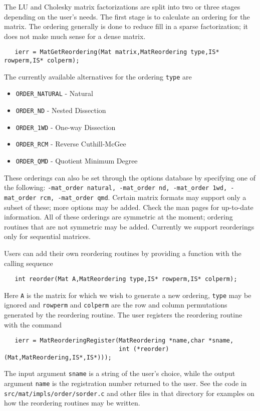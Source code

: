 The LU and Cholesky 
matrix factorizations are split into 
two or three stages depending on the user's needs. The first stage is 
to calculate an ordering for the matrix.  The ordering generally is 
done to reduce fill in a sparse factorization; it does not make much 
sense for a dense matrix.  
\begin{verbatim}
   ierr = MatGetReordering(Mat matrix,MatReordering type,IS* rowperm,IS* colperm); 
\end{verbatim}
The currently available alternatives for the ordering {\tt type} are 
\begin{itemize}
\item {\tt ORDER\_NATURAL} - Natural
\item {\tt ORDER\_ND} - Nested Dissection
\item {\tt ORDER\_1WD} - One-way Dissection
\item {\tt ORDER\_RCM} - Reverse Cuthill-McGee
\item {\tt ORDER\_QMD} - Quotient Minimum Degree
\end{itemize}
These orderings can also be set through the options database by specifying 
one of the following:  {\tt -mat\_order natural, -mat\_order nd, 
-mat\_order 1wd, -mat\_order rcm, -mat\_order qmd}.
  
  
  
 
Certain matrix formats may support only a subset of these; more options may 
be added. Check the man pages for up-to-date information. All of these orderings are 
symmetric at the moment; ordering routines that are 
not symmetric may be added. Currently we support reorderings only for 
sequential matrices.

Users can add their own reordering routines 
by providing a function with the calling sequence
\begin{verbatim}
   int reorder(Mat A,MatReordering type,IS* rowperm,IS* colperm);
\end{verbatim}
Here {\tt A} is the matrix for which we wish to generate a new ordering, 
{\tt type} may be ignored and {\tt rowperm} and {\tt colperm} are the row
and column permutations generated by the reordering routine.
The user registers the reordering routine
with the command
\begin{verbatim}
   ierr = MatReorderingRegister(MatReordering *name,char *sname,
                                int (*reorder)(Mat,MatReordering,IS*,IS*)));
\end{verbatim}
The   
input argument {\tt *sname} is a string of the user's choice, while the output
argument {\tt *name} is the registration number returned to the user.
See the code in {\tt src/mat/impls/order/sorder.c} and other files in that 
directory for examples on how the reordering routines may be written.

